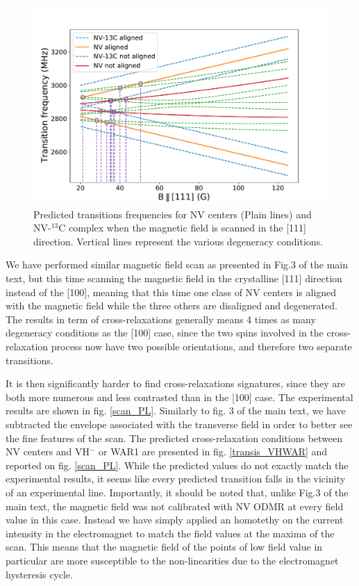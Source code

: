 \documentclass{article}
\begin{document}
\begin{figure}
\label{transis_13C}
\includegraphics[scale=.55]{Transis_111_13C}
\caption{Predicted transitions frequencies for NV centers (Plain lines) and NV-$^{13}$C complex when the magnetic field is scanned in the [111] direction. Vertical lines represent the various degeneracy conditions.}
\end{figure}

We have performed similar magnetic field scan as presented in Fig.3 of the main text, but this time scanning the magnetic field in the crystalline [111] direction instead of the [100], meaning that this time one class of NV centers is aligned with the magnetic field while the three others are disaligned and degenerated. The results in term of cross-relaxations generally means 4 times as many degeneracy conditions as the [100] case, since the two spins involved in the cross-relaxation process now have two possible orientations, and therefore two separate transitions.

It is then significantly harder to find cross-relaxations signatures, since they are both more numerous and less contrasted than in the [100] case. The experimental results are shown in fig. \ref{scan_PL}. Similarly to fig. 3 of the main text, we have subtracted the envelope associated with the transverse field in order to better see the fine features of the scan. The predicted cross-relaxation conditions between NV centers and VH$^-$ or WAR1 are presented in fig. \ref{transis_VHWAR} and reported on fig. \ref{scan_PL}. While the predicted values do not exactly match the experimental results, it seems like every predicted transition falls in the vicinity of an experimental line. Importantly, it should be noted that, unlike Fig.3 of the main text, the magnetic field was not calibrated with NV ODMR at every field value in this case. Instead we have simply applied an homotethy on the current intensity in the electromagnet to match the field values at the maxima of the scan. This means that the magnetic field of the points of low field value in particular are more susceptible to the non-linearities due to the electromagnet hysteresis cycle.
\end{document}
